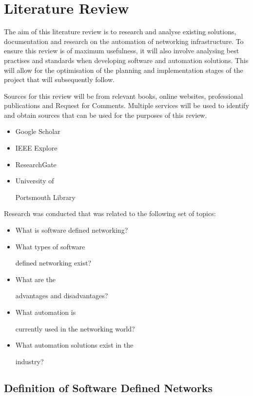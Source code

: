 \chapter{Literature Review}
\label{chap:litreview}
The aim of this literature
review is to research and analyse existing
solutions, documentation and
research on the automation of networking
infrastructure. To ensure this review
is of maximum usefulness, it will also
involve analysing best practises and
standards when developing software and
automation solutions. This will allow
for the optimisation of the planning and
implementation stages of the project
that will subsequently follow.

Sources for this review will be from relevant
books, online websites,
professional publications and Request for Comments.
Multiple services will be
used to identify and obtain sources that can be used
for the purposes of this
review.
\begin{itemize}
      \item Google Scholar

      \item IEEE Explore
      \item ResearchGate
      \item University of

            Portsmouth
            Library
\end{itemize}
Research was conducted that
was
related to the following
set of topics:
\begin{itemize}
      \item What is
            software defined networking?

      \item What types of software

            defined
            networking exist?
      \item What are the

            advantages and
            disadvantages?
      \item What automation is

            currently used in
            the
            networking world?

      \item
            What automation solutions exist in the

            industry?
\end{itemize}

\section{Definition of Software Defined Networks}
\label{litreview:definition}

